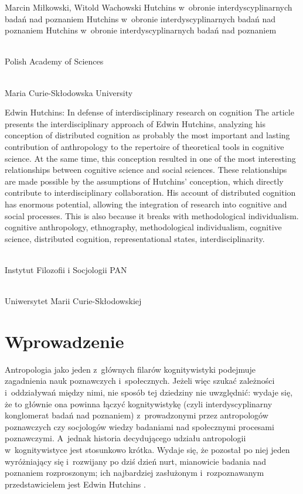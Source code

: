 \begin{artplenv2auth}{Marcin Miłkowski, Witold Wachowski}
	{Hutchins w~obronie interdyscyplinarnych badań nad poznaniem}
	{Hutchins w~obronie interdyscyplinarnych badań nad poznaniem}
	{Hutchins w~obronie interdyscyplinarnych badań nad poznaniem}
	{\flushright{}\\\subsubsectit\small{Polish Academy of Sciences}\par
		\flushright{}\\\subsubsectit\small{Maria Curie-Skłodowska University}\par}
	{Edwin Hutchins: In defense of interdisciplinary research on cognition}
	{The article presents the interdisciplinary approach of Edwin Hutchins, analyzing his conception of distributed cognition as probably the most important and lasting contribution of anthropology to the repertoire of theoretical tools in cognitive science. At the same time, this conception resulted in one of the most interesting relationships between cognitive science and social sciences. These relationships are made possible by the assumptions of Hutchins' conception, which directly contribute to interdisciplinary collaboration. His account of distributed cognition has enormous potential, allowing the integration of research into cognitive and social processes. This is also because it breaks with methodological individualism.}
	{cognitive anthropology, ethnography, methodological individualism, cognitive science, distributed cognition, representational states, interdisciplinarity.}
		{\flushright{}\\\subsubsectit\small{Instytut Filozofii i Socjologii PAN}\par
			\flushright{}\\\subsubsectit\small{Uniwersytet Marii Curie-Skłodowskiej}\par}
	
	


\section{Wprowadzenie}
\lettrine[loversize=0.13,lines=2,lraise=-0.01,nindent=0em,findent=0.2pt]%
{A}{}ntropologia jako jeden z~głównych filarów kognitywistyki podejmuje zagadnienia nauk poznawczych i~społecznych. Jeżeli więc szukać zależności i~oddziaływań między nimi, nie sposób tej dziedziny nie uwzględnić: wydaje się, że to głównie ona powinna łączyć kognitywistykę (czyli interdyscyplinarny konglomerat badań nad poznaniem) z~prowadzonymi przez antropologów poznawczych czy socjologów wiedzy badaniami nad społecznymi procesami poznawczymi. A~jednak historia decydującego udziału antropologii w~kognitywistyce jest stosunkowo krótka. Wydaje się, że pozostał po niej jeden wyróżniający się i~rozwijany po dziś dzień nurt, mianowicie badania nad poznaniem rozproszonym; ich najbardziej zasłużonym i~rozpoznawanym przedstawicielem jest Edwin Hutchins
\parencite*[][]{hutchins_hutchins_2022}.%





\end{artplenv2auth}
